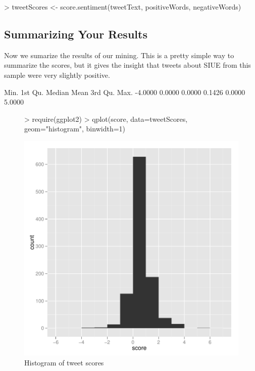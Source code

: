 \documentclass[letterpaper, 12pt]{article}
\begin{document}
\begin{Schunk}
\begin{Sinput}
> tweetScores <- score.sentiment(tweetText, positiveWords, negativeWords)
\end{Sinput}
\end{Schunk}


\subsection{Summarizing Your Results}
Now we sumarize the results of our mining. This is a pretty simple way to summarize the scores, but it gives the insight that tweets about SIUE from this sample were very slightly positive.
\begin{Schunk}
\begin{Soutput}
   Min. 1st Qu.  Median    Mean 3rd Qu.    Max. 
-4.0000  0.0000  0.0000  0.1426  0.0000  5.0000 
\end{Soutput}
\end{Schunk}

\begin{figure}[htbp]
\centering
\begin{Schunk}
\begin{Sinput}
> require(ggplot2)
> qplot(score, data=tweetScores, geom="histogram", binwidth=1)
\end{Sinput}
\end{Schunk}
\includegraphics{Handout-008}
\caption{Histogram of tweet scores}
\end{figure}
\end{document}
